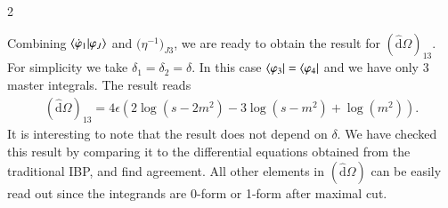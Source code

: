 \documentclass[fleqn]{2023SCGE}
\newcommand{\nds}{\hat{\mathrm{d}}}
\newcommand{\ep}{\epsilon}
\begin{document}
\begin{multicols}{2}
\begin{appendix}
Combining $\braket{\dot{\varphi}_1|\varphi_J}$ and $\big( \eta^{-1} \big)_{J3}$, we are ready to obtain the result for $(\nds\Omega)_{13}$. For simplicity we take $\delta_1=\delta_2=\delta$. In this case $\bra{\varphi_3} = \bra{\varphi_4}$ and we have only 3 master integrals. The result reads
\begin{align}
(\nds\Omega)_{13} = 4\ep \left( 2\log(s-2m^2) - 3\log(s-m^2) + \log(m^2) \right) .
\end{align}
It is interesting to note that the result does not depend on $\delta$. We have checked this result by comparing it to the differential equations obtained from the traditional IBP, and find agreement. All other elements in $(\nds\Omega)$ can be easily read out since the integrands are 0-form or 1-form after maximal cut.


\end{appendix}






\end{multicols}
\end{document}

